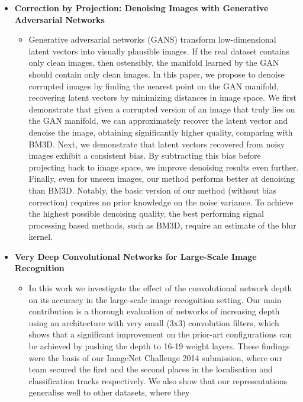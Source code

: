 \documentclass[12pt]{article}
\begin{document}
\begin{itemize}
\item \textbf{Correction by Projection: Denoising Images with Generative
  Adversarial Networks} \cite{DBLP:journals/corr/abs-1803-04477}
  \begin{itemize}
  \item Generative adversarial networks (GANS) transform low-dimensional
    latent vectors into visually plausible images. If the real dataset
    contains only clean images, then ostensibly, the manifold learned by the
    GAN should contain only clean images. In this paper, we propose to
    denoise corrupted images by finding the nearest point on the GAN
    manifold, recovering latent vectors by minimizing distances in image
    space. We first demonstrate that given a corrupted version of an image
    that truly lies on the GAN manifold, we can approximately recover the
    latent vector and denoise the image, obtaining significantly higher
    quality, comparing with BM3D. Next, we demonstrate that latent vectors
    recovered from noisy images exhibit a consistent bias. By subtracting
    this bias before projecting back to image space, we improve denoising
    results even further. Finally, even for unseen images, our method performs
    better at denoising than BM3D. Notably, the basic version of our method
    (without bias correction) requires no prior knowledge on the noise
    variance. To achieve the highest possible denoising quality, the best
    performing signal processing based methods, such as BM3D, require an
    estimate of the blur kernel.
  \end{itemize}
\item \textbf{Very Deep Convolutional Networks for Large-Scale Image
  Recognition} \cite{DBLP:journals/corr/SimonyanZ14a}
  \begin{itemize}
  \item In this work we investigate the effect of the convolutional network
    depth on its accuracy in the large-scale image recognition setting. Our
    main contribution is a thorough evaluation of networks of increasing
    depth using an architecture with very small (3x3) convolution filters,
    which shows that a significant improvement on the prior-art
    configurations can be achieved by pushing the depth to 16-19 weight
    layers. These findings were the basis of our ImageNet Challenge 2014
    submission, where our team secured the first and the second places in
    the localisation and classification tracks respectively. We also show
    that our representations generalise well to other datasets, where they

\end{itemize}
\end{itemize}
\end{document}
